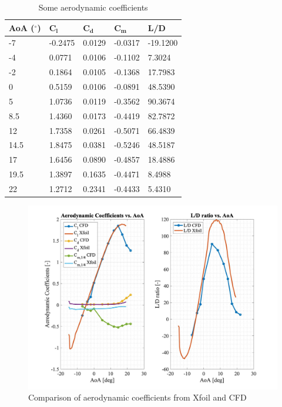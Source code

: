 \begin{table}[H]
\caption{Some aerodynamic coefficients}
\centering
\begin{tabular}{|l|l|l|l|l|} \hline
\textbf{AoA ($^\circ$)} & $\boldsymbol{C_l}$ & $\boldsymbol{C_d}$ & $\boldsymbol{C_m}$ & \textbf{L/D} \\ \hline \hline
-7           & -0.2475        & 0.0129         & -0.0317        & -19.1200     \\ \hline
-4           & 0.0771         & 0.0106         & -0.1102        & 7.3024       \\ \hline
-2           & 0.1864         & 0.0105         & -0.1368        & 17.7983      \\ \hline
0            & 0.5159         & 0.0106         & -0.0891        & 48.5390      \\ \hline
5            & 1.0736         & 0.0119         & -0.3562        & 90.3674      \\ \hline
8.5          & 1.4360         & 0.0173         & -0.4419        & 82.7872      \\ \hline
12           & 1.7358         & 0.0261         & -0.5071        & 66.4839      \\ \hline
14.5         & 1.8475         & 0.0381         & -0.5246        & 48.5187      \\ \hline
17           & 1.6456         & 0.0890         & -0.4857        & 18.4886      \\ \hline
19.5         & 1.3897         & 0.1635         & -0.4471        & 8.4988       \\ \hline
22           & 1.2712         & 0.2341         & -0.4433        & 5.4310       \\ \hline
\end{tabular}
\end{table}

\begin{figure}[H]
	\centering
	\includegraphics[width=\textwidth]{coeffs.jpg}
	\caption{Comparison of aerodynamic coefficients from Xfoil and CFD}
\label{fig:coeffs}
\end{figure}


